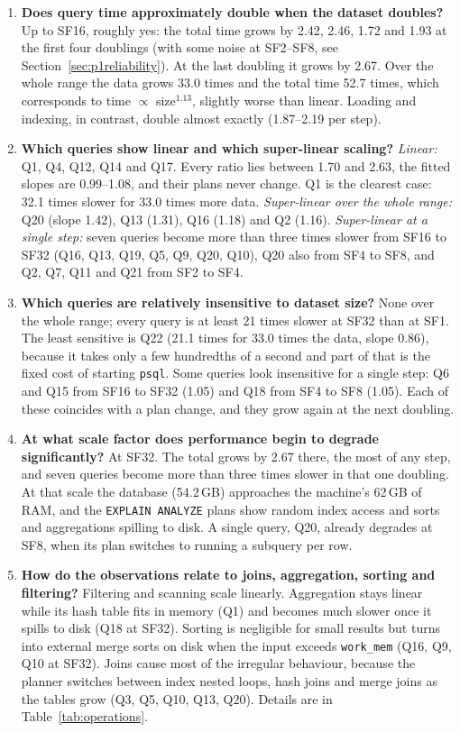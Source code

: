 \documentclass[11pt,a4paper]{article}
\newcommand{\file}[1]{\texttt{#1}}
\begin{document}
\begin{enumerate}[label=\textbf{(\arabic*)}, leftmargin=2.2em]
\item \textbf{Does query time approximately double when the dataset doubles?}
Up to SF16, roughly yes: the total time grows by 2.42, 2.46, 1.72 and 1.93 at
the first four doublings (with some noise at SF2--SF8, see
Section~\ref{sec:p1reliability}). At the last doubling it grows by 2.67. Over
the whole range the data grows 33.0 times and the total time 52.7 times, which
corresponds to time $\propto$ size$^{1.13}$, slightly worse than linear.
Loading and indexing, in contrast, double almost exactly (1.87--2.19 per step).

\item \textbf{Which queries show linear and which super-linear scaling?}
\emph{Linear:} Q1, Q4, Q12, Q14 and Q17. Every ratio lies between 1.70 and
2.63, the fitted slopes are 0.99--1.08, and their plans never change. Q1 is
the clearest case: 32.1 times slower for 33.0 times more data.
\emph{Super-linear over the whole range:} Q20 (slope 1.42), Q13 (1.31), Q16
(1.18) and Q2 (1.16). \emph{Super-linear at a single step:} seven queries
become more than three times slower from SF16 to SF32 (Q16, Q13, Q19, Q5, Q9,
Q20, Q10), Q20 also from SF4 to SF8, and Q2, Q7, Q11 and Q21 from SF2 to SF4.

\item \textbf{Which queries are relatively insensitive to dataset size?}
None over the whole range; every query is at least 21 times slower at SF32
than at SF1. The least sensitive is Q22 (21.1 times for 33.0 times the data,
slope 0.86), because it takes only a few hundredths of a second and part of
that is the fixed cost of starting \file{psql}. Some queries look insensitive
for a single step: Q6 and Q15 from SF16 to SF32 (1.05) and Q18 from SF4 to SF8
(1.05). Each of these coincides with a plan change, and they grow again at the
next doubling.

\item \textbf{At what scale factor does performance begin to degrade
significantly?} At SF32. The total grows by 2.67 there, the most of any step,
and seven queries become more than three times slower in that one doubling.
At that scale the database (54.2\,GB) approaches the machine's 62\,GB of RAM,
and the \file{EXPLAIN ANALYZE} plans show random index access and sorts and
aggregations spilling to disk. A single query, Q20, already degrades at SF8,
when its plan switches to running a subquery per row.

\item \textbf{How do the observations relate to joins, aggregation, sorting
and filtering?} Filtering and scanning scale linearly. Aggregation stays
linear while its hash table fits in memory (Q1) and becomes much slower once
it spills to disk (Q18 at SF32). Sorting is negligible for small results but
turns into external merge sorts on disk when the input exceeds
\file{work\_mem} (Q16, Q9, Q10 at SF32). Joins cause most of the irregular
behaviour, because the planner switches between index nested loops, hash
joins and merge joins as the tables grow (Q3, Q5, Q10, Q13, Q20). Details are
in Table~\ref{tab:operations}.
\end{enumerate}
\end{document}
